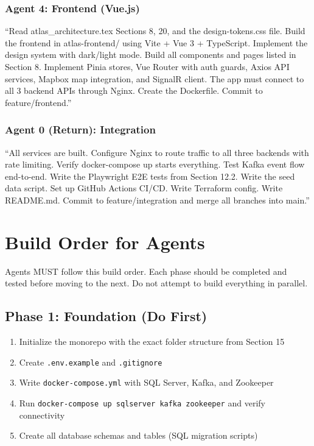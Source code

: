 \documentclass[12pt,letterpaper]{article}
\begin{document}
\subsubsection{Agent 4: Frontend (Vue.js)}
``Read atlas\_architecture.tex Sections 8, 20, and the design-tokens.css file. Build the frontend in atlas-frontend/ using Vite + Vue 3 + TypeScript. Implement the design system with dark/light mode. Build all components and pages listed in Section 8. Implement Pinia stores, Vue Router with auth guards, Axios API services, Mapbox map integration, and SignalR client. The app must connect to all 3 backend APIs through Nginx. Create the Dockerfile. Commit to feature/frontend.''

\subsubsection{Agent 0 (Return): Integration}
``All services are built. Configure Nginx to route traffic to all three backends with rate limiting. Verify docker-compose up starts everything. Test Kafka event flow end-to-end. Write the Playwright E2E tests from Section 12.2. Write the seed data script. Set up GitHub Actions CI/CD. Write Terraform config. Write README.md. Commit to feature/integration and merge all branches into main.''

\newpage

\section{Build Order for Agents}

Agents MUST follow this build order. Each phase should be completed and tested before moving to the next. Do not attempt to build everything in parallel.

\subsection{Phase 1: Foundation (Do First)}
\begin{enumerate}
  \item Initialize the monorepo with the exact folder structure from Section 15
  \item Create \texttt{.env.example} and \texttt{.gitignore}
  \item Write \texttt{docker-compose.yml} with SQL Server, Kafka, and Zookeeper
  \item Run \texttt{docker-compose up sqlserver kafka zookeeper} and verify connectivity
  \item Create all database schemas and tables (SQL migration scripts)
\end{enumerate}
\end{document}

